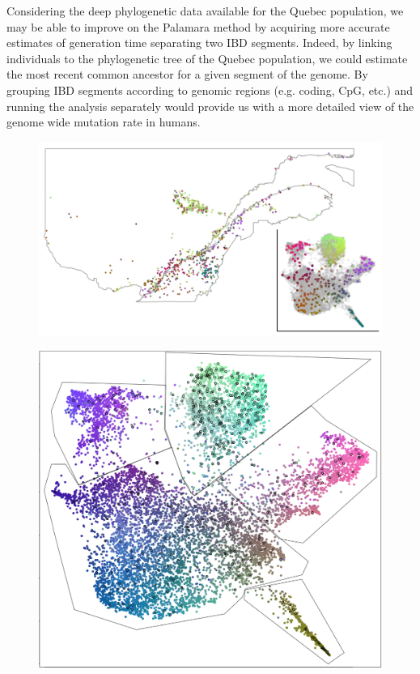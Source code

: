 \documentclass[
11pt, %
oneside, %
english, %
doublespacing, %
headsepline, %
]{MastersDoctoralThesis} %
\begin{document}
Considering the deep phylogenetic data available for the Quebec population, we may be able to improve on the Palamara method by acquiring more accurate estimates of generation time separating two IBD segments.
Indeed, by linking individuals to the phylogenetic tree of the Quebec population, we could estimate the most recent common ancestor for a given segment of the genome.
By grouping IBD segments according to genomic regions (e.g. coding, CpG, etc.) and running the analysis separately would provide us with a more detailed view of the genome wide mutation rate in humans.





\appendix %

\begin{figure}
\includegraphics[width=\hsize,keepaspectratio]{./Figures/Genizon_BalSac_mapsInMaps4.jpg}
\label{UMAP}
\end{figure}

\begin{figure}
\includegraphics[width=\hsize,keepaspectratio]{./Figures/5Clusters.png}
\label{Cluster}
\end{figure}
\end{document}
